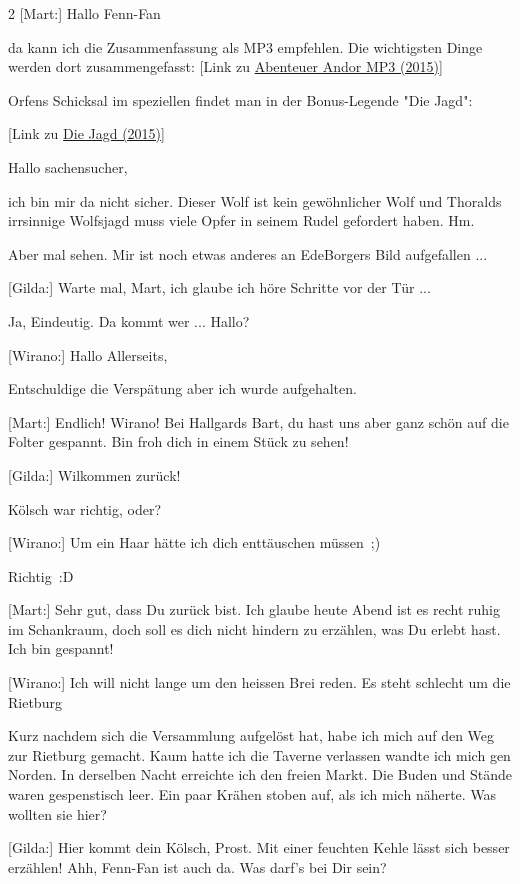 \documentclass[10pt, a4paper, oneside]{book}
\begin{document}
\begin{multicols}{2}
[Mart:] Hallo Fenn-Fan

da kann ich die Zusammenfassung als MP3 empfehlen. Die wichtigsten Dinge werden dort zusammengefasst: [Link zu \hyperref[storytext-2015-abenteuer-andor-mp3]{Abenteuer Andor MP3 (2015)}]

Orfens Schicksal im speziellen findet man in der Bonus-Legende "Die Jagd":

[Link zu \hyperref[legende-2015-die-jagd]{Die Jagd (2015)}]


Hallo sachensucher,

ich bin mir da nicht sicher. Dieser Wolf ist kein gewöhnlicher Wolf und Thoralds irrsinnige Wolfsjagd muss viele Opfer in seinem Rudel gefordert haben. Hm.

Aber mal sehen. Mir ist noch etwas anderes an EdeBorgers Bild aufgefallen ...

[Gilda:] Warte mal, Mart, ich glaube ich höre Schritte vor der Tür ...

Ja, Eindeutig. Da kommt wer ... Hallo?

[Wirano:] Hallo Allerseits,

Entschuldige die Verspätung aber ich wurde aufgehalten.

[Mart:] Endlich! Wirano! Bei Hallgards Bart, du hast uns aber ganz schön auf die Folter gespannt. Bin froh dich in einem Stück zu sehen!

[Gilda:] Wilkommen zurück!

Kölsch war richtig, oder?

[Wirano:] Um ein Haar hätte ich dich enttäuschen müssen ;)

Richtig :D

[Mart:] Sehr gut, dass Du zurück bist. Ich glaube heute Abend ist es recht ruhig im Schankraum, doch soll es dich nicht hindern zu erzählen, was Du erlebt hast. Ich bin gespannt!

[Wirano:] Ich will nicht lange um den heissen Brei reden. Es steht schlecht um die Rietburg

Kurz nachdem sich die Versammlung aufgelöst hat, habe ich mich auf den Weg zur Rietburg gemacht. Kaum hatte ich die Taverne verlassen wandte ich mich gen Norden. In derselben Nacht erreichte ich den freien Markt. Die Buden und Stände waren gespenstisch leer. Ein paar Krähen stoben auf, als ich mich näherte. Was wollten sie hier?

[Gilda:] Hier kommt dein Kölsch, Prost. Mit einer feuchten Kehle lässt sich besser erzählen!
Ahh, Fenn-Fan ist auch da. Was darf's bei Dir sein?


\end{multicols}
\end{document}
